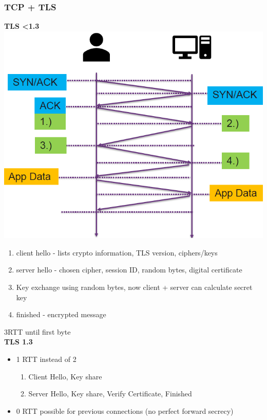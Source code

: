 \subsubsection{TCP + TLS}
\textbf{TLS \textless 1.3}
\includegraphics[width=0.7\linewidth]{../img/tcp_tls.png}
\begin{enumerate}
    \item client hello - lists crypto information, TLS version, ciphers/keys
    \item server hello - chosen cipher, session ID, random bytes, digital certificate
    \item Key exchange using random bytes, now client + server can calculate secret key
    \item finished - encrypted message
\end{enumerate}
3RTT until first byte\\
\textbf{TLS 1.3}
\begin{itemize}
    \item 1 RTT instead of 2
    \begin{enumerate}
        \item Client Hello, Key share
        \item Server Hello, Key share, Verify Certificate, Finished
    \end{enumerate}
    \item 0 RTT possible for previous connections (no perfect forward secrecy)
\end{itemize}

